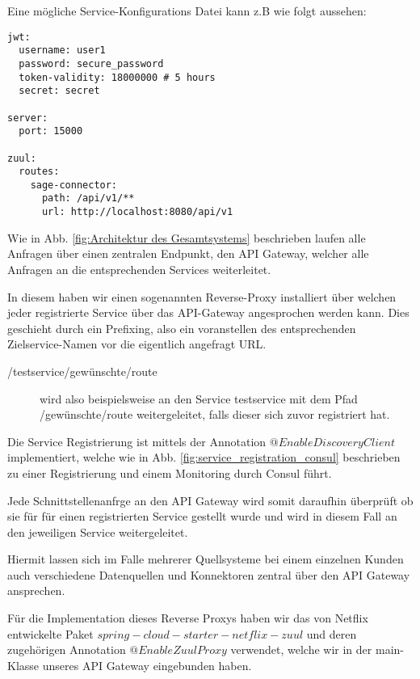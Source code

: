 Eine mögliche Service-Konfigurations Datei kann z.B wie folgt aussehen:


\begin{lstlisting}[caption= Auszug aus einer YAML Konfigurationsdatei]
jwt:
  username: user1
  password: secure_password
  token-validity: 18000000 # 5 hours
  secret: secret

server:
  port: 15000

zuul:
  routes:
    sage-connector:
      path: /api/v1/**
      url: http://localhost:8080/api/v1
\end{lstlisting}


Wie in Abb. \ref{fig:Architektur des Gesamtsystems} beschrieben laufen alle Anfragen über einen zentralen Endpunkt, den API Gateway, welcher alle Anfragen an die entsprechenden Services weiterleitet. 

In diesem haben wir einen sogenannten Reverse-Proxy installiert über welchen jeder registrierte Service über das API-Gateway angesprochen werden kann. Dies geschieht durch ein Prefixing, also ein voranstellen des entsprechenden Zielservice-Namen vor die eigentlich angefragt URL.

\begin{description}
    \item [/testservice/gewünschte/route] wird also beispielsweise an den Service testservice mit dem Pfad /gewünschte/route weitergeleitet, falls dieser sich zuvor registriert hat. 
\end{description}

Die Service Registrierung ist mittels der Annotation $@EnableDiscoveryClient$ implementiert, welche wie in Abb. \ref{fig:service_registration_consul} beschrieben zu einer Registrierung und einem Monitoring durch Consul führt.

Jede Schnittstellenanfrge an den API Gateway wird somit daraufhin überprüft ob sie für für einen registrierten Service gestellt wurde und wird in diesem Fall an den jeweiligen Service weitergeleitet.

Hiermit lassen sich im Falle mehrerer Quellsysteme bei einem einzelnen Kunden auch verschiedene Datenquellen und Konnektoren zentral über den API Gateway ansprechen.

Für die Implementation dieses Reverse Proxys haben wir das von Netflix entwickelte Paket $spring-cloud-starter-netflix-zuul$ und deren zugehörigen Annotation $@EnableZuulProxy$ verwendet, welche wir in der main-Klasse unseres API Gateway eingebunden haben.

